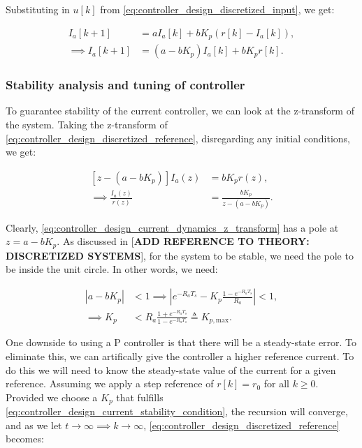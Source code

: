 Substituting in $u[k]$ from \cref{eq:controller_design_discretized_input}, we get:

\begin{equation}
    \label{eq:controller_design_discretized_reference}
    \begin{aligned}
        I_a[k+1] &= a I_a[k] + b K_p (r[k] - I_a[k]),\\
        \implies I_a[k+1] &= \left(a - b K_p\right) I_a[k] + b K_p r[k].
    \end{aligned}
\end{equation}



\subsubsection{Stability analysis and tuning of controller}

To guarantee stability of the current controller, we can look at the z-transform of the system. Taking the z-transform of \cref{eq:controller_design_discretized_reference}, disregarding any initial conditions, we get:

\begin{equation}
    \label{eq:controller_design_current_dynamics_z_transform}
    \begin{aligned}
        \left[z - (a - b K_p)\right] I_a(z) &= b K_p r(z),\\
        \implies \frac{I_a(z)}{r(z)} &= \frac{b K_p}{z - (a - b K_p)}.
    \end{aligned}
\end{equation}

Clearly, \cref{eq:controller_design_current_dynamics_z_transform} has a pole at $z = a - b K_p$. As discussed in [\textbf{ADD REFERENCE TO THEORY: DISCRETIZED SYSTEMS}], for the system to be stable, we need the pole to be inside the unit circle. In other words, we need:

\begin{equation}
    \label{eq:controller_design_current_stability_condition}
    \begin{aligned}
        |a - b K_p| &< 1 \implies \left|e^{-R_a T_s} - K_p \frac{1 - e^{-R_a T_s}}{R_a}\right| < 1,\\
        \implies K_p &< R_a \frac{1 + e^{-R_a T_s}}{1 - e^{-R_a T_s}} \triangleq K_{p,\text{max}}.
    \end{aligned}
\end{equation}

One downside to using a P controller is that there will be a steady-state error. To eliminate this, we can artifically give the controller a higher reference current. To do this we will need to know the steady-state value of the current for a given reference. Assuming we apply a step reference of $r[k] = r_0$ for all $k \geq 0$. Provided we choose a $K_p$ that fulfills \cref{eq:controller_design_current_stability_condition}, the recursion will converge, and as we let $t \to \infty \implies k \to \infty$, \cref{eq:controller_design_discretized_reference} becomes:

